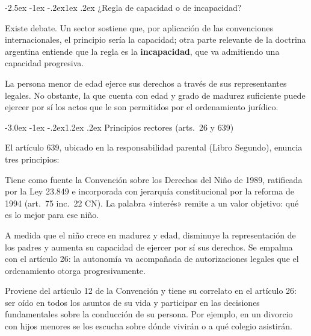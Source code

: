 \documentclass[12pt,oneside]{book}
\makeatletter
\renewcommand\section{\@startsection{section}{1}{\z@}%
  {-3.0ex \@plus -1ex \@minus -.2ex}{1.2ex \@plus .2ex}%
  {\normalfont\large\bfseries\color{acento}}}
\renewcommand\subsection{\@startsection{subsection}{2}{\z@}%
  {-2.5ex \@plus -1ex \@minus -.2ex}{1ex \@plus .2ex}%
  {\normalfont\normalsize\bfseries}}
\makeatother
\begin{document}
\subsection{¿Regla de capacidad o de incapacidad?}

Existe debate. Un sector sostiene que, por aplicación de las convenciones internacionales, el principio sería la capacidad; otra parte relevante de la doctrina argentina entiende que la regla es la \textbf{incapacidad}, que va admitiendo una capacidad progresiva.

\begin{regla}
La persona menor de edad ejerce sus derechos a través de sus representantes legales. No obstante, la que cuenta con edad y grado de madurez suficiente puede ejercer por sí los actos que le son permitidos por el ordenamiento jurídico.
\end{regla}

\section{Principios rectores (arts.~26 y 639)}

El artículo 639, ubicado en la responsabilidad parental (Libro Segundo), enuncia tres principios:

\begin{description}[leftmargin=0pt,style=unboxed]
\item[Interés superior del niño.] Tiene como fuente la Convención sobre los Derechos del Niño de 1989, ratificada por la Ley 23.849 e incorporada con jerarquía constitucional por la reforma de 1994 (art.~75 inc.~22 CN). La palabra «interés» remite a un valor objetivo: qué es lo mejor para ese niño.
\item[Autonomía progresiva.] A medida que el niño crece en madurez y edad, disminuye la representación de los padres y aumenta su capacidad de ejercer por sí sus derechos. Se empalma con el artículo 26: la autonomía va acompañada de autorizaciones legales que el ordenamiento otorga progresivamente.
\item[Derecho a ser oído.] Proviene del artículo 12 de la Convención y tiene su correlato en el artículo 26: ser oído en todos los asuntos de su vida y participar en las decisiones fundamentales sobre la conducción de su persona. Por ejemplo, en un divorcio con hijos menores se los escucha sobre dónde vivirán o a qué colegio asistirán.
\end{description}
\end{document}
